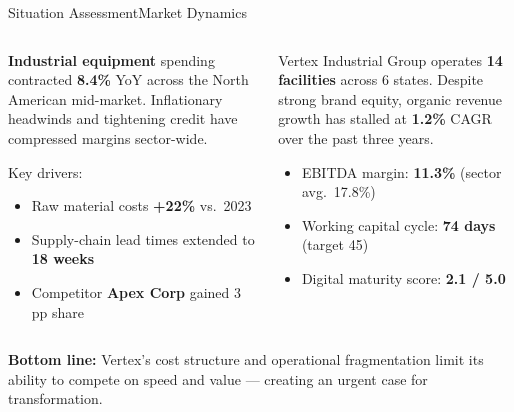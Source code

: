 \begin{frame}{Situation Assessment}{Market Dynamics}
  \vspace{0.1cm}
  \begin{columns}[T]
      \begin{tcolorbox}[nexacard, title={\faChartLine\; Market Pressure}]
        \small
        \textbf{Industrial equipment} spending contracted
        \textbf{8.4\%} YoY across the North American
        mid-market. Inflationary headwinds and tightening
        credit have compressed margins sector-wide.\par
        \medskip
        Key drivers:\par
        \begin{itemize}\setlength\itemsep{2pt}
          \item Raw material costs \textbf{+22\%} vs.\ 2023
          \item Supply-chain lead times extended to \textbf{18 weeks}
          \item Competitor \textbf{Apex Corp} gained 3 pp share
        \end{itemize}
      \end{tcolorbox}
      \begin{tcolorbox}[nexacard, title={\faBuilding\; Vertex Today}]
        \small
        Vertex Industrial Group operates \textbf{14 facilities}
        across 6 states. Despite strong brand equity,
        organic revenue growth has stalled at \textbf{1.2\%}
        CAGR over the past three years.\par
        \medskip
        \begin{itemize}\setlength\itemsep{2pt}
          \item EBITDA margin: \textbf{11.3\%} (sector avg.\ 17.8\%)
          \item Working capital cycle: \textbf{74 days} (target 45)
          \item Digital maturity score: \textbf{2.1 / 5.0}
        \end{itemize}
      \end{tcolorbox}
  \end{columns}
  \vspace{0.25cm}
  \begin{tcolorbox}[nexahighlight]
    \small
    \textcolor{NexaDark}{%
      \textbf{\faLightbulb\; Bottom line:}
      Vertex's cost structure and operational fragmentation
      limit its ability to compete on speed and value --- creating
      an urgent case for transformation.}
  \end{tcolorbox}
\end{frame}

